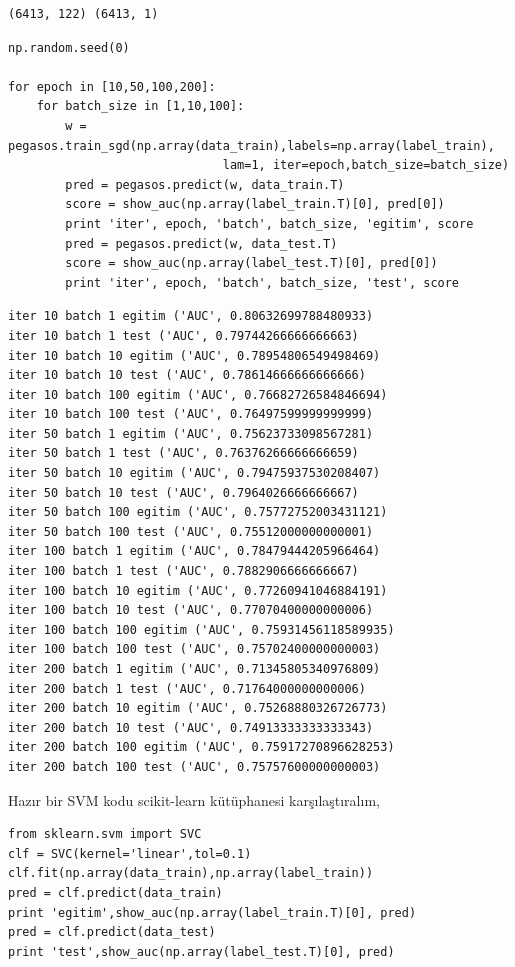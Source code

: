 \documentclass[12pt,fleqn]{article}\usepackage{../../common}
\begin{document}
\begin{verbatim}
(6413, 122) (6413, 1)
\end{verbatim}

\begin{verbatim}
np.random.seed(0)
  
for epoch in [10,50,100,200]:
    for batch_size in [1,10,100]:
        w = pegasos.train_sgd(np.array(data_train),labels=np.array(label_train),
                              lam=1, iter=epoch,batch_size=batch_size)
        pred = pegasos.predict(w, data_train.T)
        score = show_auc(np.array(label_train.T)[0], pred[0])
        print 'iter', epoch, 'batch', batch_size, 'egitim', score
        pred = pegasos.predict(w, data_test.T)
        score = show_auc(np.array(label_test.T)[0], pred[0])
        print 'iter', epoch, 'batch', batch_size, 'test', score
\end{verbatim}

\begin{verbatim}
iter 10 batch 1 egitim ('AUC', 0.80632699788480933)
iter 10 batch 1 test ('AUC', 0.79744266666666663)
iter 10 batch 10 egitim ('AUC', 0.78954806549498469)
iter 10 batch 10 test ('AUC', 0.78614666666666666)
iter 10 batch 100 egitim ('AUC', 0.76682726584846694)
iter 10 batch 100 test ('AUC', 0.76497599999999999)
iter 50 batch 1 egitim ('AUC', 0.75623733098567281)
iter 50 batch 1 test ('AUC', 0.76376266666666659)
iter 50 batch 10 egitim ('AUC', 0.79475937530208407)
iter 50 batch 10 test ('AUC', 0.7964026666666667)
iter 50 batch 100 egitim ('AUC', 0.75772752003431121)
iter 50 batch 100 test ('AUC', 0.75512000000000001)
iter 100 batch 1 egitim ('AUC', 0.78479444205966464)
iter 100 batch 1 test ('AUC', 0.7882906666666667)
iter 100 batch 10 egitim ('AUC', 0.77260941046884191)
iter 100 batch 10 test ('AUC', 0.77070400000000006)
iter 100 batch 100 egitim ('AUC', 0.75931456118589935)
iter 100 batch 100 test ('AUC', 0.75702400000000003)
iter 200 batch 1 egitim ('AUC', 0.71345805340976809)
iter 200 batch 1 test ('AUC', 0.71764000000000006)
iter 200 batch 10 egitim ('AUC', 0.75268880326726773)
iter 200 batch 10 test ('AUC', 0.74913333333333343)
iter 200 batch 100 egitim ('AUC', 0.75917270896628253)
iter 200 batch 100 test ('AUC', 0.75757600000000003)
\end{verbatim}

Hazır bir SVM kodu scikit-learn kütüphanesi karşılaştıralım, 

\begin{verbatim}
from sklearn.svm import SVC
clf = SVC(kernel='linear',tol=0.1)
clf.fit(np.array(data_train),np.array(label_train))
pred = clf.predict(data_train)
print 'egitim',show_auc(np.array(label_train.T)[0], pred)
pred = clf.predict(data_test)
print 'test',show_auc(np.array(label_test.T)[0], pred)
\end{verbatim}
\end{document}
